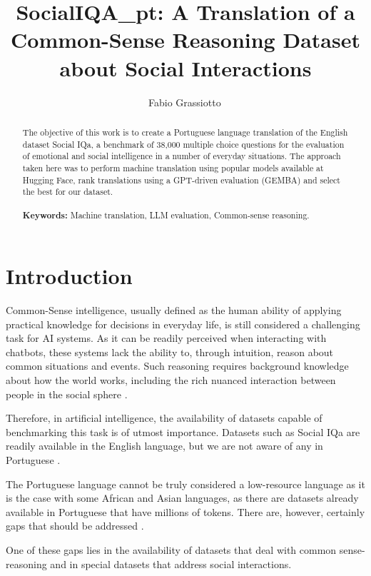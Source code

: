 \documentclass{article}
\title{SocialIQA\_pt: A Translation of a Common-Sense Reasoning Dataset about Social Interactions}
\author{Fabio Grassiotto\,\orcidlink{0000-0003-1885-842X}}
\date{}
\begin{document}
\maketitle

\begin{abstract}
    The objective of this work is to create a Portuguese language translation of
    the English dataset Social IQa, a benchmark of 38,000 multiple choice
    questions for the evaluation of emotional and social intelligence in a
    number of everyday situations. The approach taken here was to perform
    machine translation using popular models available at Hugging Face, rank
    translations using a GPT-driven evaluation (GEMBA) and select the best for
    our dataset.\\
    \\
    \textbf{Keywords:} Machine translation, LLM evaluation, Common-sense reasoning.
\end{abstract}

\section{Introduction} 

Common-Sense intelligence, usually defined as the human ability of applying
practical knowledge for decisions in everyday life, is still considered a
challenging task for AI systems. As it can be readily perceived when interacting
with chatbots, these systems lack the ability to, through intuition, reason
about common situations and events. Such reasoning requires background knowledge
about how the world works, including the rich nuanced interaction between people
in the social sphere \cite{choi2022curious, krause2023commonsense}.

Therefore, in artificial intelligence, the availability of datasets capable of
benchmarking this task is of utmost importance. Datasets such as Social IQa are
readily available in the English language, but we are not aware of any in
Portuguese \cite{sap2019socialiqa}.

The Portuguese language cannot be truly considered a low-resource language as
it is the case with some African and Asian languages, as there are
datasets already available in Portuguese that have millions of tokens. There
are, however, certainly gaps that should be addressed \cite{ghafoor2021impact}.

One of these gaps lies in the availability of datasets that deal with common
sense-reasoning and in special datasets that address social interactions.
\end{document}
